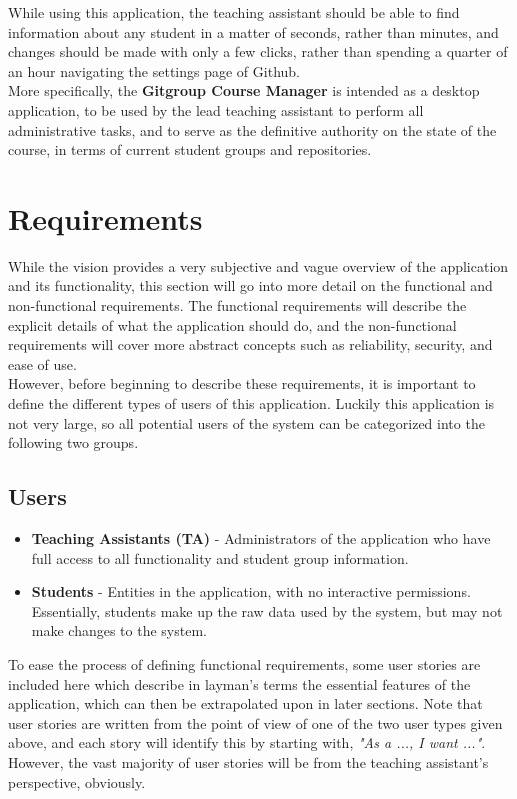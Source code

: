 \documentclass{article}
\begin{document}
		\noindent
		While using this application, the teaching assistant should be able to find information about any student in a matter of seconds, rather than minutes, and changes should be made with only a few clicks, rather than spending a quarter of an hour navigating the settings page of Github.\\
		
		\noindent
		More specifically, the \textbf{Gitgroup Course Manager} is intended as a desktop application, to be used by the lead teaching assistant to perform all administrative tasks, and to serve as the definitive authority on the state of the course, in terms of current student groups and repositories.

\section{Requirements}
	While the vision provides a very subjective and vague overview of the application and its functionality, this section will go into more detail on the functional and non-functional requirements. The functional requirements will describe the explicit details of what the application should do, and the non-functional requirements will cover more abstract concepts such as reliability, security, and ease of use.\\
	
	\noindent
	However, before beginning to describe these requirements, it is important to define the different types of users of this application. Luckily this application is not very large, so all potential users of the system can be categorized into the following two groups.
	
	\subsection{Users}
	
		\begin{itemize}
			\item \textbf{Teaching Assistants (TA)} - Administrators of the application who have full access to all functionality and student group information.
		
			\item \textbf{Students} - Entities in the application, with no interactive permissions. Essentially, students make up the raw data used by the system, but may not make changes to the system.
		\end{itemize}
		
		\noindent
		To ease the process of defining functional requirements, some user stories are included here which describe in layman's terms the essential features of the application, which can then be extrapolated upon in later sections. Note that user stories are written from the point of view of one of the two user types given above, and each story will identify this by starting with, \textit{"As a ..., I want ..."}. However, the vast majority of user stories will be from the teaching assistant's perspective, obviously.
		
\end{document}

